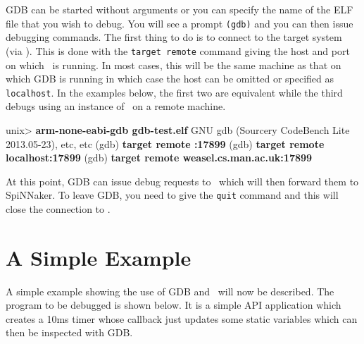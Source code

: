 GDB can be started without arguments or you can specify the name of
the ELF file that you wish to debug. You will see a
prompt \texttt{(gdb)} and you can then issue debugging commands. The
first thing to do is to connect to the target system
(via \gdbspin). This is done with the \texttt{target remote} command
giving the host and port on which \gdbspin\ is running.  In most
cases, this will be the same machine as that on which GDB is running
in which case the host can be omitted or specified
as \texttt{localhost}. In the examples below, the first two are
equivalent while the third debugs using an instance of
\gdbspin\ on a remote machine.

\begin{shell}
unix> \textbf{arm-none-eabi-gdb gdb-test.elf}
GNU gdb (Sourcery CodeBench Lite 2013.05-23), etc, etc
(gdb) \textbf{target remote :17899}
(gdb) \textbf{target remote localhost:17899}
(gdb) \textbf{target remote weasel.cs.man.ac.uk:17899}
\end{shell}

At this point, GDB can issue debug requests to \gdbspin\ which will
then forward them to SpiNNaker. To leave GDB, you need to give
the \texttt{quit} command and this will close the connection to
\gdbspin.

\section{A Simple Example}

A simple example showing the use of GDB and \gdbspin\ will now be
described. The program to be debugged is shown below. It is a simple
API application which creates a 10ms timer whose callback just updates
some static variables which can then be inspected with GDB.

